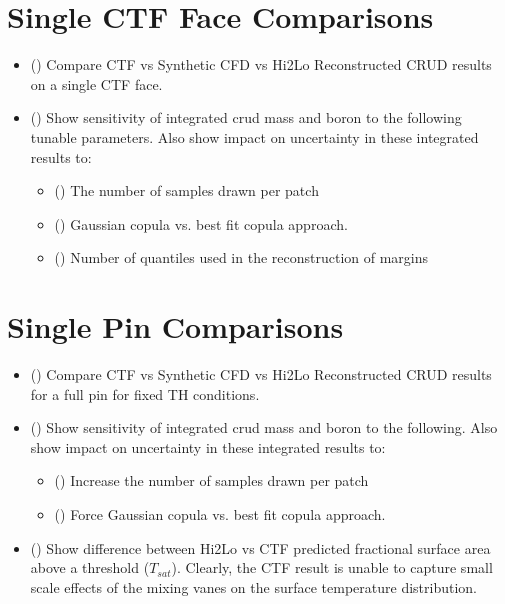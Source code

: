\section{Single CTF Face Comparisons}
\begin{itemize}
    \item (\checkmark) Compare CTF vs Synthetic CFD vs Hi2Lo Reconstructed CRUD results on a single CTF face.
    \item (\checkmark) Show sensitivity of integrated crud mass and boron to the following tunable parameters.  Also show impact on uncertainty in these integrated results to:
        \begin{itemize}
            \item (\checkmark) The number of samples drawn per patch
            \item (\checkmark) Gaussian copula vs. best fit copula approach.
            \item (\checkmark) Number of quantiles used in the reconstruction of margins
        \end{itemize}
\end{itemize}

\section{Single Pin Comparisons}

\begin{itemize}
    \item (\checkmark) Compare CTF vs Synthetic CFD vs Hi2Lo Reconstructed CRUD results for a full pin for fixed TH conditions.
    \item (\checkmark) Show sensitivity of integrated crud mass and boron to the following.  Also show impact on uncertainty in these integrated results to:
        \begin{itemize}
            \item (\checkmark) Increase the number of samples drawn per patch
            \item (\checkmark) Force Gaussian copula vs. best fit copula approach.
        \end{itemize}
    \item (\checkmark) Show difference between Hi2Lo vs CTF predicted fractional surface area above a threshold ($T_{sat}$).  Clearly, the CTF result
        is unable to capture small scale effects of the mixing vanes on the surface temperature distribution.
\end{itemize}

